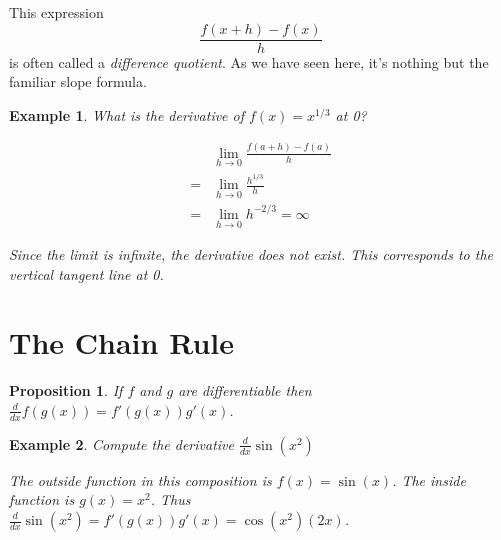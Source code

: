 \documentclass[11pt]{book}
\newtheorem{prop}{Proposition}
\newtheorem{example}{Example}
\numberwithin{example}{chapter}
\begin{document}
This expression 
$$\frac{f(x+h)-f(x)}{h}$$
is often called a \emph{difference quotient}.  As we have seen here, it's nothing but the familiar slope formula.  


\begin{example}
What is the derivative of $f(x)=x^{1/3}$ at 0?


\begin{center}
\end{center}


\begin{align*}
&\lim_{h\to 0}\frac{f(a+h)-f(a)}{h}\\
=&\lim_{h\to 0}\frac{h^{1/3}}{h}\\
=& \lim_{h\to 0} h^{-2/3}=\infty
\end{align*}

Since the limit is infinite, the derivative does not exist.  This corresponds to the vertical tangent line at 0.



\end{example}





\section{The Chain Rule}


\begin{prop}
If $f$ and $g$ are differentiable then $\frac{d}{dx}f(g(x)) = f'(g(x))g'(x)$.
\end{prop}

\begin{example}

Compute the derivative $\frac{d}{dx}\sin(x^2)$

The outside function in this composition is $f(x)=\sin(x)$.  The inside function is $g(x)=x^2$.  Thus $\frac{d}{dx}\sin(x^2) = f'(g(x))g'(x)= \cos(x^2)(2x)$.

\end{example}
\end{document}
